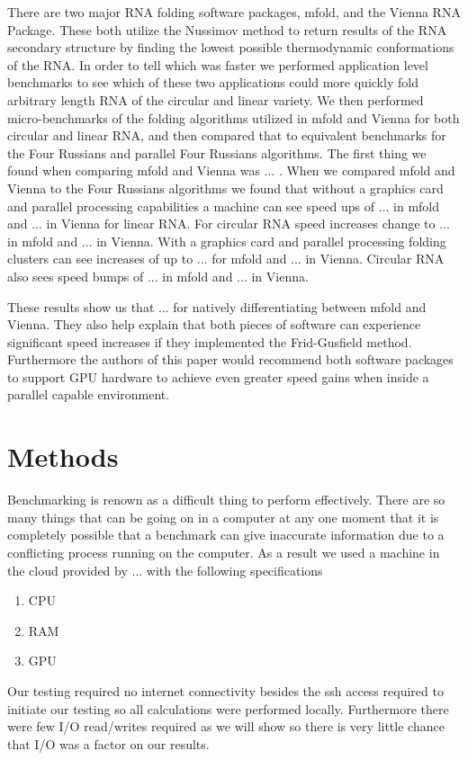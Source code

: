 \documentclass[12pt]{article}
\begin{document}
\par There are two major RNA folding software packages, mfold\cite{zuker1989,zuker1981}, and the Vienna RNA Package\cite{vienna}. These both utilize the Nussimov method to return results of the RNA secondary structure by finding the lowest possible thermodynamic conformations of the RNA\cite{zuker1981,vienna}. In order to tell which was faster we performed application level benchmarks\cite{eulogy} to see which of these two applications could more quickly fold arbitrary length RNA of the circular and linear variety. We then performed micro-benchmarks\cite{sysperformance} of the folding algorithms utilized in mfold and Vienna for both circular and linear RNA, and then compared that to equivalent benchmarks for the Four Russians and parallel Four Russians algorithms. The first thing we found when comparing mfold and Vienna was ... . When we compared mfold and Vienna to the Four Russians algorithms we found that without a graphics card and parallel processing capabilities a machine can see speed ups of ... in mfold and ... in Vienna for linear RNA. For circular RNA speed increases change to ... in mfold and ... in Vienna. With a graphics card and parallel processing folding clusters can see increases of up to ... for mfold and ... in Vienna. Circular RNA also sees speed bumps of ... in mfold and ... in Vienna.
\par These results show us that ... for natively differentiating between mfold and Vienna. They also help explain that both pieces of software can experience significant speed increases if they implemented the Frid-Gusfield method. Furthermore the authors of this paper would recommend both software packages to support GPU hardware to achieve even greater speed gains when inside a parallel capable environment.

\section{Methods}
Benchmarking is renown as a difficult thing to perform effectively\cite{sysperformance,eulogy}. There are so many things that can be going on in a computer at any one moment that it is completely possible that a benchmark can give inaccurate information due to a conflicting process running on the computer\cite{sysperformance}. As a result we used a machine in the cloud provided by ... with the following specifications
\begin{enumerate}
\item CPU
\item RAM
\item GPU
\end{enumerate}
Our testing required no internet connectivity besides the ssh access required to initiate our testing so all calculations were performed locally. Furthermore there were few I/O read/writes required as we will show so there is very little chance that I/O was a factor on our results.
\end{document}
